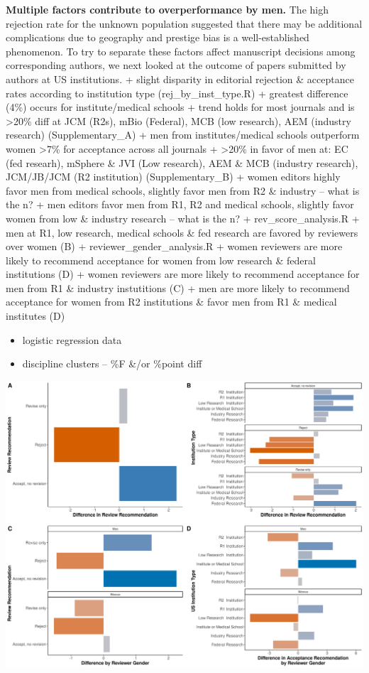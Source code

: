 \documentclass[11pt,]{article}
\providecommand{\tightlist}{%
  \setlength{\itemsep}{0pt}\setlength{\parskip}{0pt}}
\begin{document}
\textbf{Multiple factors contribute to overperformance by men.} The high
rejection rate for the unknown population suggested that there may be
additional complications due to geography and prestige bias is a
well-established phenomenon. To try to separate these factors affect
manuscript decisions among corresponding authors, we next looked at the
outcome of papers submitted by authors at US institutions. + slight
disparity in editorial rejection \& acceptance rates according to
institution type (rej\_by\_inst\_type.R) + greatest difference (4\%)
occurs for institute/medical schools + trend holds for most journals and
is \textgreater{}20\% diff at JCM (R2s), mBio (Federal), MCB (low
research), AEM (industry research) (Supplementary\_A) + men from
institutes/medical schools outperform women \textgreater{}7\% for
acceptance across all journals + \textgreater{}20\% in favor of men at:
EC (fed researh), mSphere \& JVI (Low research), AEM \& MCB (industry
research), JCM/JB/JCM (R2 institution) (Supplementary\_B) + women
editors highly favor men from medical schools, slightly favor men from
R2 \& industry -- what is the n? + men editors favor men from R1, R2 and
medical schools, slightly favor women from low \& industry research --
what is the n? + rev\_score\_analysis.R + men at R1, low research,
medical schools \& fed research are favored by reviewers over women (B)
+ reviewer\_gender\_analysis.R + women reviewers are more likely to
recommend acceptance for women from low research \& federal institutions
(D) + women reviewers are more likely to recommend acceptance for men
from R1 \& industry instutitions (C) + men are more likely to recommend
acceptance for women from R2 institutions \& favor men from R1 \&
medical institutes (D)

\begin{itemize}
\tightlist
\item
  logistic regression data
\item
  discipline clusters -- \%F \&/or \%point diff
\end{itemize}

\includegraphics{Figure_8.png}
\end{document}
